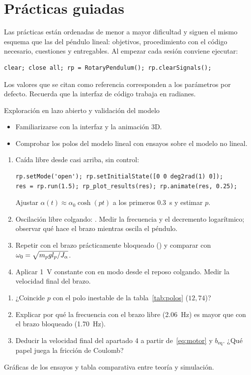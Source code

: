\chapter{Prácticas guiadas}
\label{cap:practicas}

Las prácticas están ordenadas de menor a mayor dificultad y siguen el mismo esquema que las del péndulo lineal: objetivos, procedimiento con el código necesario, cuestiones y entregables. Al empezar cada sesión conviene ejecutar:
\begin{lstlisting}
clear; close all; rp = RotaryPendulum(); rp.clearSignals();
\end{lstlisting}
Los valores que se citan como referencia corresponden a los parámetros por defecto. Recuerda que la interfaz de código trabaja en radianes.

\label{pr:explora}
\begin{practica}{Exploración en lazo abierto y validación del modelo}
\objetivos
\begin{itemize}
  \item Familiarizarse con la interfaz y la animación 3D.
  \item Comprobar los polos del modelo lineal con ensayos sobre el modelo no lineal.
\end{itemize}
\procedimiento
\begin{enumerate}
  \item Caída libre desde casi arriba, sin control:
\begin{lstlisting}
rp.setMode('open'); rp.setInitialState([0 0 deg2rad(1) 0]);
res = rp.run(1.5); rp_plot_results(res); rp.animate(res, 0.25);
\end{lstlisting}
  Ajustar $\alpha(t)\approx\alpha_0\cosh(pt)$ a los primeros \SI{0.3}{s} y estimar $p$.
  \item Oscilación libre colgando: . Medir la frecuencia y el decremento logarítmico; observar qué hace el brazo mientras oscila el péndulo.
  \item Repetir con el brazo prácticamente bloqueado () y comparar con $\omega_0=\sqrt{m_pgl_p/J_\alpha}$.
  \item Aplicar \SI{1}{V} constante con  en modo  desde el reposo colgando. Medir la velocidad final del brazo.
\end{enumerate}
\preguntas
\begin{enumerate}
  \item ¿Coincide $p$ con el polo inestable de la tabla~\ref{tab:polos} ($12{,}74$)?
  \item Explicar por qué la frecuencia con el brazo libre (\SI{2.06}{Hz}) es mayor que con el brazo bloqueado (\SI{1.70}{Hz}).
  \item Deducir la velocidad final del apartado 4 a partir de~\eqref{eq:motor} y $b_{\text{eq}}$. ¿Qué papel juega la fricción de Coulomb?
\end{enumerate}
\entregables Gráficas de los ensayos y tabla comparativa entre teoría y simulación.
\end{practica}

